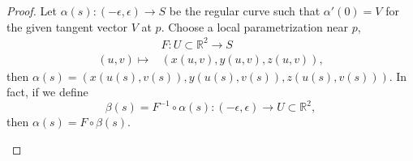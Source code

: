 \begin{proof}
    Let \(\alpha(s)\colon (-\epsilon,\epsilon)\to S\) be the regular curve
    such that \(\alpha'(0)=V\) for the given tangent vector \(V\) at \(p\).
    Choose a local parametrization near \(p\),
    \begin{align*}
                     & F\colon  U\subset \mathbb{R}^2\to S \\
        (u,v)\mapsto & \left(x(u,v),y(u,v),z(u,v)\right)
        ,\end{align*}
    then \(\alpha(s)=\left(x\left(u(s),v(s)\right),y\left(u(s),v(s)\right),
    z\left(u(s),v(s)\right)\right)\). In fact, if we define
    \[
        \beta(s)=F^{-1}\circ\alpha(s)\colon (-\epsilon,\epsilon)\to U\subset
        \mathbb{R}^2
        ,\]
    then \(\alpha(s)=F\circ \beta (s)\).
    \begin{center}




        \begin{tikzpicture}[x=0.75pt,y=0.75pt,yscale=-1,xscale=1]


\end{tikzpicture}
\end{center}
\end{proof}
